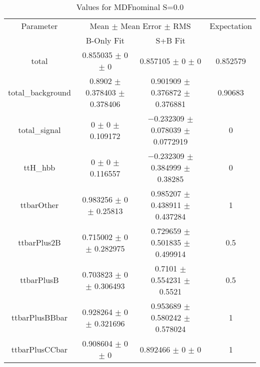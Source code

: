 \begin{table}
\centering
\caption{Values for MDFnominal S=0.0}
\begin{tabular}{cccc}
\toprule
Parameter & \multicolumn{2}{c}{Mean $\pm$ Mean Error $\pm$ RMS} & Expectation\\
 & B-Only Fit & S+B Fit & \\
\midrule
total & \num{0.855035} $\pm$ \num{0} $\pm$ \num{0} & \num{0.857105} $\pm$ \num{0} $\pm$ \num{0} & \num{0.852579}\\
total\_background & \num{0.8902} $\pm$ \num{0.378403} $\pm$ \num{0.378406} & \num{0.901909} $\pm$ \num{0.376872} $\pm$ \num{0.376881} & \num{0.90683}\\
total\_signal & \num{0} $\pm$ \num{0} $\pm$ \num{0.109172} & \num{-0.232309} $\pm$ \num{0.078039} $\pm$ \num{0.0772919} & \num{0}\\
ttH\_hbb & \num{0} $\pm$ \num{0} $\pm$ \num{0.116557} & \num{-0.232309} $\pm$ \num{0.384999} $\pm$ \num{0.38285} & \num{0}\\
ttbarOther & \num{0.983256} $\pm$ \num{0} $\pm$ \num{0.25813} & \num{0.985207} $\pm$ \num{0.438911} $\pm$ \num{0.437284} & \num{1}\\
ttbarPlus2B & \num{0.715002} $\pm$ \num{0} $\pm$ \num{0.282975} & \num{0.729659} $\pm$ \num{0.501835} $\pm$ \num{0.499914} & \num{0.5}\\
ttbarPlusB & \num{0.703823} $\pm$ \num{0} $\pm$ \num{0.306493} & \num{0.7101} $\pm$ \num{0.554231} $\pm$ \num{0.5521} & \num{0.5}\\
ttbarPlusBBbar & \num{0.928264} $\pm$ \num{0} $\pm$ \num{0.321696} & \num{0.953689} $\pm$ \num{0.580242} $\pm$ \num{0.578024} & \num{1}\\
ttbarPlusCCbar & \num{0.908604} $\pm$ \num{0} $\pm$ \num{0} & \num{0.892466} $\pm$ \num{0} $\pm$ \num{0} & \num{1}\\
\bottomrule
\end{tabular}
\end{table}